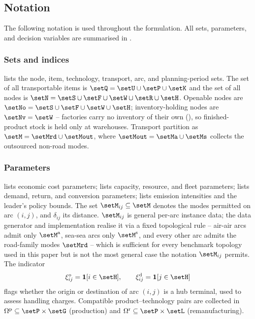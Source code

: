\subsection{Notation}
\label{sec:model:notation}

The following notation is used throughout the formulation. All
sets, parameters, and decision variables are summarised in
.



\subsubsection{Sets and indices}
\label{sec:model:sets}

 lists the node, item, technology, transport, arc,
and planning-period sets. The set of all transportable items is
$\setQ=\setU\cup\setP\cup\setK$ and the set of all nodes is
$\setN=\setS\cup\setF\cup\setW\cup\setR\cup\setH$.
Openable nodes are $\setNo=\setS\cup\setF\cup\setW\cup\setH$;
inventory-holding nodes are $\setNv=\setW$ -- factories carry no
inventory of their own (), so finished-product
stock is held only at warehouses.
Transport partition as $\setM=\setMrd\cup\setMout$, where
$\setMout=\setMa\cup\setMs$ collects the outsourced non-road modes.

\subsubsection{Parameters}
\label{sec:model:parameters}

 lists economic cost parameters;
 lists capacity, resource, and fleet
parameters;  lists demand, return, and
conversion parameters;  lists emission
intensities and the leader's policy bounds. The set
$\setM_{ij}\subseteq\setM$ denotes the modes permitted on arc $(i,j)$,
and $\delta_{ij}$ its distance. $\setM_{ij}$ is general per-arc
instance data; the data generator and implementation realise it via a
fixed topological rule -- air-air arcs admit only $\setM^{\mathrm{a}}$,
sea-sea arcs only $\setM^{\mathrm{s}}$, and every other arc admits the
road-family modes $\setMrd$ -- which is sufficient for every benchmark
topology used in this paper but is not the most general case the
notation $\setM_{ij}$ permits. The indicator
\begin{equation*}
\xi^{\mathrm{o}}_{ij}=\mathbf{1}[i\in\setH], \qquad
\xi^{\mathrm{d}}_{ij}=\mathbf{1}[j\in\setH]
\end{equation*}
flags whether the origin or destination of arc $(i,j)$ is a hub
terminal, used to assess handling charges. Compatible
product--technology pairs are collected in
$\Omega^{\mathrm{p}}\subseteq\setP\times\setG$ (production) and
$\Omega^{\mathrm{r}}\subseteq\setP\times\setL$ (remanufacturing).

